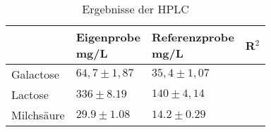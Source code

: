 
\begin{table}[htbp]
  \centering
  \caption{Ergebnisse der HPLC}
    \begin{tabular}{lllr}
    \toprule
     & \makecell{Eigenprobe \\ mg/L} & \makecell{Referenzprobe \\ mg/L} & R$^2$ \\
    \midrule
    Galactose & $64,7 \pm 1,87$ & $35,4 \pm 1,07$ &  \\
    Lactose & $336 \pm 8.19$ & $140 \pm 4,14$ &   \\
    Milchsäure & $29.9 \pm 1.08$ & $14.2 \pm 0.29$ &  \\
    \bottomrule
    \end{tabular}%
  \label{tab:hplcErg}%
\end{table}%
